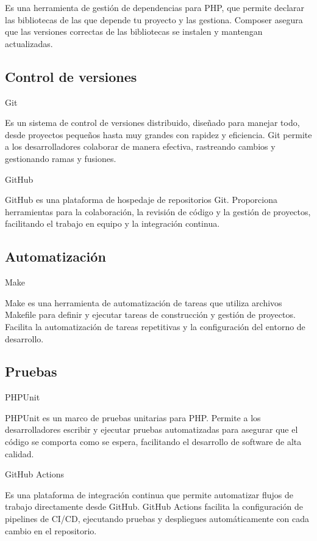 Es una herramienta de gestión de dependencias para PHP, que
permite declarar las bibliotecas de las que depende tu proyecto
y las gestiona.
Composer asegura que las versiones correctas de las bibliotecas se instalen y mantengan actualizadas.

\subsection{Control de versiones}

Git

Es un sistema de control de versiones distribuido, diseñado para manejar todo, desde proyectos
pequeños hasta muy grandes con rapidez y eficiencia.
Git permite a los desarrolladores colaborar de manera efectiva, rastreando cambios y gestionando ramas y fusiones.


GitHub

GitHub es una plataforma de hospedaje de repositorios Git.
Proporciona herramientas para la colaboración, la revisión de código y la gestión de proyectos, facilitando el trabajo
en equipo y la integración continua.

\subsection{Automatización}

Make

Make es una herramienta de automatización de tareas que utiliza archivos Makefile para definir y ejecutar tareas de
construcción y gestión de proyectos.
Facilita la automatización de tareas repetitivas y la configuración del entorno de desarrollo.

\subsection{Pruebas}

PHPUnit

PHPUnit es un marco de pruebas unitarias para PHP. Permite a los desarrolladores escribir y ejecutar pruebas
automatizadas
para asegurar que el código se comporta como se espera, facilitando el desarrollo de software de alta calidad.

GitHub Actions

Es una plataforma de integración continua que permite automatizar flujos de trabajo directamente desde GitHub.
GitHub Actions facilita la configuración de pipelines de CI/CD, ejecutando pruebas y despliegues automáticamente con
cada cambio en el repositorio.


